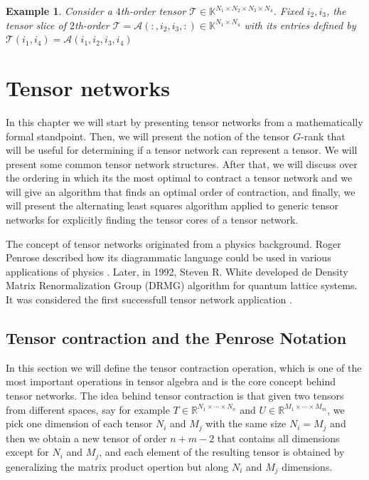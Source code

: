 \documentclass[11pt,a4paper,openright,oneside]{book}
\numberwithin{equation}{section}
\newtheorem{example0}[defn0]{Example}
\newenvironment{example}{ \begin{example0}\rm}{\end{example0}}
\begin{document}
\begin{example}
    Consider a $4$th-order tensor $\mathcal{T} \in \mathbb{K}^{N_1 \times N_2 \times N_3 \times N_4}$. 
    Fixed $i_2, i_3$, the tensor slice of $2$th-order $\mathcal{T} = \mathcal{A}(:, i_2, i_3, :) \in \mathbb{K}^{N_1 \times N_4}$ 
    with its entries defined by ${\mathcal{T}(i_1, i_4) = \mathcal{A}(i_1, i_2, i_3, i_4)}$
\end{example}
\fi


\chapter{Tensor networks}

In this chapter we will start by presenting tensor networks from a mathematically formal standpoint. Then, we will present the notion
of the tensor $G$-rank that will be useful for determining if a tensor network can represent a tensor. We will present some common
tensor network structures. After that, we will discuss over the ordering in which its the most optimal to contract a tensor network
and we will give an algorithm that finds an optimal order of contraction, and finally, we will present the alternating least
squares algorithm applied to generic tensor networks for explicitly finding the tensor cores of a tensor network.

The concept of tensor networks originated from a physics background. Roger Penrose described how its
diagrammatic language could be used in various applications of physics \cite{rogerPenroseApplications}. Later, 
in 1992, Steven R. White developed de Density Matrix Renormalization Group (DRMG) algorithm for
quantum lattice systems. It was considered the first successfull tensor network application \cite{whiteDensityMatrixFormulation1992}.



\section{Tensor contraction and the Penrose Notation}

In this section we will define the tensor contraction operation, which is one of the most important operations
in tensor algebra and is the core concept behind tensor networks.
The idea behind tensor contraction is that given two tensors from different spaces, say for example
$T \in \mathbb{R}^{N_1 \times \cdots \times N_n}$ and $U \in \mathbb{R}^{M_1 \times \cdots \times M_m}$, we pick one dimension of
each tensor $N_i$ and $M_j$ with the same size $N_i = M_j$ and then we obtain a new tensor of order $n + m - 2$ that contains all dimensions except for $N_i$ and $M_j$, and
each element of the resulting tensor is obtained by generalizing the matrix product opertion but along $N_i$ and $M_j$ dimensions.
\end{document}

